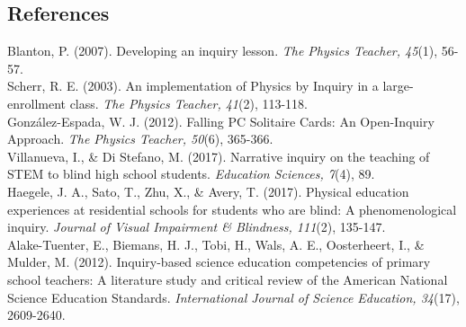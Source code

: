 \documentclass[11.5pt]{sig-alternate}
\begin{document}
\begin{large}
 
\section*{References}\par 

\leftskip 0.25in
\parindent -0.25in 
Blanton, P. (2007). Developing an inquiry lesson. \textit{The Physics Teacher, 45}(1), 56-57.\\

Scherr, R. E. (2003). An implementation of Physics by Inquiry in a large-enrollment class. \textit{The Physics Teacher, 41}(2), 113-118.\\

González-Espada, W. J. (2012). Falling PC Solitaire Cards: An Open-Inquiry Approach. \textit{The Physics Teacher, 50}(6), 365-366.\\

Villanueva, I., \& Di Stefano, M. (2017). Narrative inquiry on the teaching of STEM to blind high school students. \textit{Education Sciences, 7}(4), 89.\\

Haegele, J. A., Sato, T., Zhu, X., \& Avery, T. (2017). Physical education experiences at residential schools for students who are blind: A phenomenological inquiry. \textit{Journal of Visual Impairment \& Blindness, 111}(2), 135-147.\\

Alake-Tuenter, E., Biemans, H. J., Tobi, H., Wals, A. E., Oosterheert, I., \& Mulder, M. (2012). Inquiry-based science education competencies of primary school teachers: A literature study and critical review of the American National Science Education Standards. \textit{International Journal of Science Education, 34}(17), 2609-2640.

\end{large}
\end{document}
